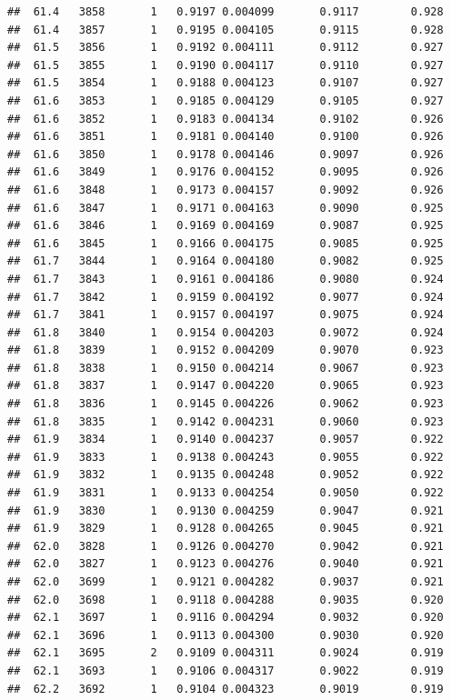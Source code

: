 \documentclass[
]{book}
\begin{document}
\begin{verbatim}
##  61.4   3858       1   0.9197 0.004099       0.9117        0.928
##  61.4   3857       1   0.9195 0.004105       0.9115        0.928
##  61.5   3856       1   0.9192 0.004111       0.9112        0.927
##  61.5   3855       1   0.9190 0.004117       0.9110        0.927
##  61.5   3854       1   0.9188 0.004123       0.9107        0.927
##  61.6   3853       1   0.9185 0.004129       0.9105        0.927
##  61.6   3852       1   0.9183 0.004134       0.9102        0.926
##  61.6   3851       1   0.9181 0.004140       0.9100        0.926
##  61.6   3850       1   0.9178 0.004146       0.9097        0.926
##  61.6   3849       1   0.9176 0.004152       0.9095        0.926
##  61.6   3848       1   0.9173 0.004157       0.9092        0.926
##  61.6   3847       1   0.9171 0.004163       0.9090        0.925
##  61.6   3846       1   0.9169 0.004169       0.9087        0.925
##  61.6   3845       1   0.9166 0.004175       0.9085        0.925
##  61.7   3844       1   0.9164 0.004180       0.9082        0.925
##  61.7   3843       1   0.9161 0.004186       0.9080        0.924
##  61.7   3842       1   0.9159 0.004192       0.9077        0.924
##  61.7   3841       1   0.9157 0.004197       0.9075        0.924
##  61.8   3840       1   0.9154 0.004203       0.9072        0.924
##  61.8   3839       1   0.9152 0.004209       0.9070        0.923
##  61.8   3838       1   0.9150 0.004214       0.9067        0.923
##  61.8   3837       1   0.9147 0.004220       0.9065        0.923
##  61.8   3836       1   0.9145 0.004226       0.9062        0.923
##  61.8   3835       1   0.9142 0.004231       0.9060        0.923
##  61.9   3834       1   0.9140 0.004237       0.9057        0.922
##  61.9   3833       1   0.9138 0.004243       0.9055        0.922
##  61.9   3832       1   0.9135 0.004248       0.9052        0.922
##  61.9   3831       1   0.9133 0.004254       0.9050        0.922
##  61.9   3830       1   0.9130 0.004259       0.9047        0.921
##  61.9   3829       1   0.9128 0.004265       0.9045        0.921
##  62.0   3828       1   0.9126 0.004270       0.9042        0.921
##  62.0   3827       1   0.9123 0.004276       0.9040        0.921
##  62.0   3699       1   0.9121 0.004282       0.9037        0.921
##  62.0   3698       1   0.9118 0.004288       0.9035        0.920
##  62.1   3697       1   0.9116 0.004294       0.9032        0.920
##  62.1   3696       1   0.9113 0.004300       0.9030        0.920
##  62.1   3695       2   0.9109 0.004311       0.9024        0.919
##  62.1   3693       1   0.9106 0.004317       0.9022        0.919
##  62.2   3692       1   0.9104 0.004323       0.9019        0.919

\end{verbatim}
\end{document}
